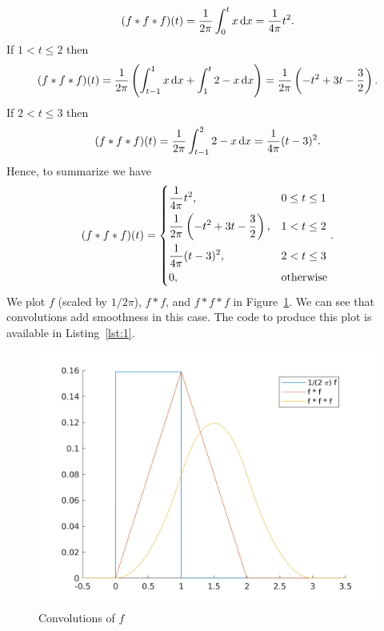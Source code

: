 \documentclass{article}
\begin{document}
%
\begin{equation*}
    (f * f * f)(t)
        = \frac{1}{2 \pi} \int_{0}^t x \dif x
        = \frac{1}{4 \pi} t^2
        .
\end{equation*}
%
If $1 < t \leq 2$ then
%
\begin{equation*}
    (f * f * f)(t)
        =
        \frac{1}{2 \pi}
        \del{
            \int_{t - 1}^1 x \dif x
            +
            \int_{1}^t 2 - x \dif x
        }
        =
        \frac{1}{2 \pi}
        \del{
            - t^2 + 3 t - \frac{3}{2}
        }
        .
\end{equation*}
%
If $2 < t \leq 3$ then
%
\begin{equation*}
    (f * f * f)(t)
        =
        \frac{1}{2 \pi}
        \int_{t - 1}^2 2 - x \dif x
        =
        \frac{1}{4 \pi}
        (t - 3)^2
        .
\end{equation*}
%
Hence, to summarize we have
%
\begin{equation*}
    (f * f * f)(t)
        =
        \begin{dcases}
            \frac{1}{4 \pi} t^2, & 0 \leq t \leq 1 \\
            \frac{1}{2 \pi}
            \del{
                - t^2 + 3 t - \frac{3}{2}
            }, & 1 < t \leq 2 \\
            \frac{1}{4 \pi}
            (t - 3)^2, & 2 < t \leq 3 \\
            0, & \text{otherwise}
        \end{dcases}
        .
\end{equation*}
%
We plot $f$ (scaled by $1 / 2 \pi$), $f * f$, and $f * f * f$ in Figure~\ref{fig:4-8}. We can
see that convolutions add smoothness in this case. The code to produce
this plot is available in Listing~\ref{lst:1}.

\begin{figure}[!ht]
    \includegraphics[width=5in]{q48}
    \centering
    \caption{Convolutions of $f$}
    \label{fig:4-8}
\end{figure}
\end{document}
